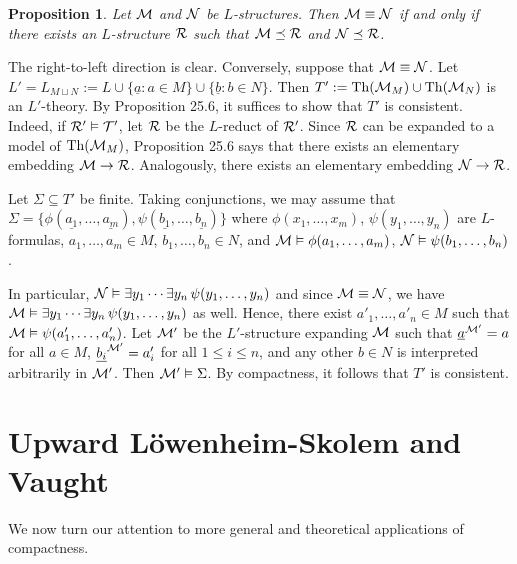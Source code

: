 \documentclass[10pt]{article}
\makeatletter
\DeclareMathOperator{\Th}{Th}
\theoremstyle{newstyle}
\newtheorem{prop}[thm]{Proposition}
\newenvironment{pf}[1][\proofname]{\par
  \pushQED{\qed}%
  \normalfont \topsep0\p@\relax
  \trivlist
  \item[\hskip\labelsep\scshape
  #1\@addpunct{.}]\ignorespaces
}{%
  \popQED\endtrivlist\@endpefalse
}
\makeatother
\begin{document}
\begin{prop}
Let ${\cal M}$ and ${\cal N}$ be $L$-structures. Then ${\cal M} \equiv {\cal N}$ if and only if 
there exists an $L$-structure ${\cal R}$ such that ${\cal M} \preceq {\cal R}$ and 
${\cal N} \preceq {\cal R}$. 
\end{prop}
\begin{pf}
The right-to-left direction is clear. Conversely, suppose that ${\cal M} \equiv {\cal N}$. 
Let $L' = L_{M\sqcup N} := L \cup \{\underline{a} : a \in M\} \cup 
\{\underline{b} : b \in N\}$. Then $T' := \Th({\cal M}_M) \cup \Th({\cal M}_N)$ 
is an $L'$-theory. By Proposition 25.6, it suffices to show that $T'$ is consistent. Indeed, 
if ${\cal R}' \vDash {\cal T}'$, let ${\cal R}$ be the $L$-reduct of ${\cal R}'$. Since 
${\cal R}$ can be expanded to a model of $\Th({\cal M}_M)$, Proposition 25.6 says that 
there exists an elementary embedding ${\cal M} \to {\cal R}$. Analogously, there exists 
an elementary embedding ${\cal N} \to {\cal R}$. 

Let $\Sigma \subseteq T'$ be finite. Taking conjunctions, we may assume that 
$\Sigma = \{\phi(\underline{a_1}, \dots, \underline{a_m}), \psi(\underline{b_1}, 
\dots, \underline{b_n})\}$ where $\phi(x_1, \dots, x_m)$, $\psi(y_1, \dots, y_n)$ are 
$L$-formulas, $a_1, \dots, a_m \in M$, $b_1, \dots, b_n \in N$, and 
${\cal M} \vDash \phi(a_1, \dots, a_m)$, ${\cal N} \vDash \psi(b_1, \dots, b_n)$. 

In particular, ${\cal N} \vDash \exists y_1 \cdots \exists y_n \, \psi(y_1, \dots, y_n)$ 
and since ${\cal M} \equiv {\cal N}$, we have 
${\cal M} \vDash \exists y_1 \cdots \exists y_n \, \psi(y_1, \dots, y_n)$ as well. 
Hence, there exist $a'_1, \dots, a'_n \in M$ such that ${\cal M} 
\vDash \psi(a'_1, \dots, a'_n)$. Let ${\cal M}'$ be the $L'$-structure expanding 
${\cal M}$ such that $\underline{a}^{{\cal M}'} = a$ for all $a \in M$, 
$\underline{b_i}^{{\cal M}'} = a'_i$ for all $1 \leq i \leq n$, and any other $b \in N$ 
is interpreted arbitrarily in ${\cal M}'$. Then ${\cal M}' \vDash \Sigma$. 
By compactness, it follows that $T'$ is consistent.
\end{pf}

\newpage 
\section{Upward L\"owenheim-Skolem and Vaught}

We now turn our attention to more general and theoretical applications of compactness. 
\end{document}
